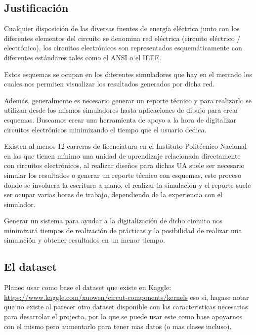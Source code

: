 \documentclass[10pt, fleqn, journal]{IEEEtran}
\theoremstyle{break}                                            %
\begin{document}
    \subsection{Justificación}

      Cualquier disposición de las diversas fuentes de energía eléctrica junto con los diferentes elementos del 
      circuito se denomina red eléctrica (circuito eléctrico / electrónico), los circuitos electrónicos son 
      representados esquemáticamente con diferentes estándares tales como el ANSI o el IEEE. 

      Estos esquemas se ocupan en los diferentes simuladores que hay en el mercado los cuales nos permiten 
      visualizar los resultados generados por dicha red. 

      Además, generalmente es necesario generar un reporte técnico y para realizarlo se utilizan desde los mismos 
      simuladores hasta aplicaciones de dibujo para crear esquemas. Buscamos crear una herramienta de 
      apoyo a la hora de digitalizar circuitos electrónicos minimizando el tiempo que el usuario dedica.

      Existen al menos 12 carreras de licenciatura en el Instituto Politécnico Nacional en las que tienen 
      mínimo una unidad de aprendizaje relacionada directamente con circuitos electrónicos, al realizar 
      diseños para dichas UA suele ser necesario simular los resultados o generar un reporte técnico con 
      esquemas, este proceso donde se involucra la escritura a mano, el realizar la simulación y el reporte 
      suele ser ocupar varias horas de trabajo, dependiendo de la experiencia con el simulador. 

      Generar un sistema para ayudar a la digitalización de dicho circuito nos minimizará tiempos de realización 
      de prácticas y la posibilidad de realizar una simulación y obtener resultados en un menor tiempo.
      
    \subsection{El dataset}

      Planeo usar como base el dataset que existe en Kaggle:
      \url{https://www.kaggle.com/xuowen/circut-components/kernels} eso si,
       hagase notar que no existe al parecer otro dataset disponible con las caracteristicas 
       necesarias para desarrolar el projecto, por lo que se puede usar este como base apoyarnos 
       con el mismo pero aumentarlo para tener mas datos (o mas clases incluso).
\end{document}

